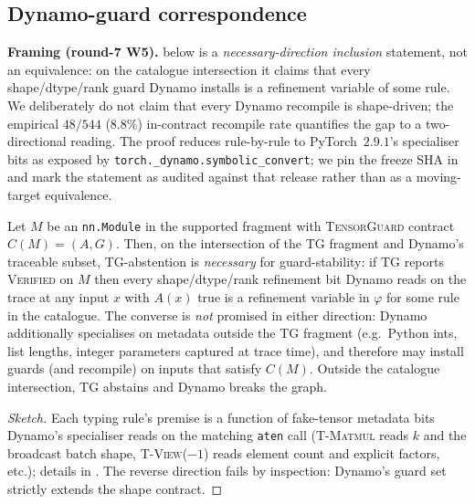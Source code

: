 \subsection{Dynamo-guard correspondence}
\label{sec:eval-dynamo}

\textbf{Framing (round-7 W5).}   below is a
\emph{necessary-direction inclusion} statement, not an equivalence:
on the catalogue intersection it claims that every shape/dtype/rank
guard Dynamo installs is a refinement variable of some
 rule.  We deliberately do not claim that every
Dynamo recompile is shape-driven; the empirical $48/544$
($8.8\%$) in-contract recompile rate quantifies the gap to a
two-directional reading. The proof reduces rule-by-rule to
PyTorch~$2.9.1$'s specialiser bits as exposed by
\texttt{torch.\_dynamo.symbolic\_convert}; we pin the freeze SHA in
 and mark the statement as audited against
that release rather than as a moving-target equivalence.

\begin{theorem}
\label{thm:dynamo-corr}
Let $M$ be an \texttt{nn.Module} in the supported fragment with
\textsc{TensorGuard} contract $C(M)=(A,G)$. Then, on the
intersection of the \textsc{TG} fragment and Dynamo's traceable
subset, \textsc{TG}-abstention is \emph{necessary} for
guard-stability: if \textsc{TG} reports \textsc{Verified} on
$M$ then every shape/dtype/rank refinement bit Dynamo reads on
the trace at any input $x$ with $A(x)$ true is a refinement
variable in $\varphi$ for some rule in the 
catalogue. The converse is \emph{not} promised in either
direction: Dynamo additionally specialises on
metadata outside the \textsc{TG} fragment (e.g.\ Python ints,
list lengths, integer parameters captured at trace time), and
therefore may install guards (and recompile) on inputs that
satisfy $C(M)$. Outside the catalogue intersection,
\textsc{TG} abstains and Dynamo breaks the graph.
\end{theorem}
\begin{proof}[Sketch]
Each typing rule's premise is a function of fake-tensor metadata
bits Dynamo's specialiser reads on the matching
\texttt{aten} call (\textsc{T-Matmul} reads $k$ and the broadcast
batch shape, \textsc{T-View($-1$)} reads element count and
explicit factors, etc.); details in .
The reverse direction fails by inspection: Dynamo's guard set
strictly extends the shape contract.
\end{proof}

